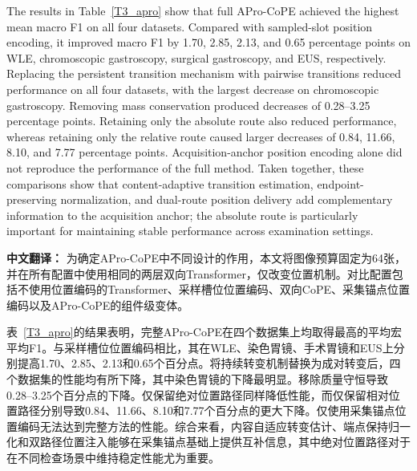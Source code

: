 \documentclass[Afour,sagev,times]{sagej}
\begin{document}
The results in Table~\ref{T3_apro} show that full APro-CoPE achieved the highest mean macro F1 on all four datasets. Compared with sampled-slot position encoding, it improved macro F1 by 1.70, 2.85, 2.13, and 0.65 percentage points on WLE, chromoscopic gastroscopy, surgical gastroscopy, and EUS, respectively. Replacing the persistent transition mechanism with pairwise transitions reduced performance on all four datasets, with the largest decrease on chromoscopic gastroscopy. Removing mass conservation produced decreases of 0.28--3.25 percentage points. Retaining only the absolute route also reduced performance, whereas retaining only the relative route caused larger decreases of 0.84, 11.66, 8.10, and 7.77 percentage points. Acquisition-anchor position encoding alone did not reproduce the performance of the full method. Taken together, these comparisons show that content-adaptive transition estimation, endpoint-preserving normalization, and dual-route position delivery add complementary information to the acquisition anchor; the absolute route is particularly important for maintaining stable performance across examination settings.

\textbf{中文翻译：} 为确定APro-CoPE中不同设计的作用，本文将图像预算固定为64张，并在所有配置中使用相同的两层双向Transformer，仅改变位置机制。对比配置包括不使用位置编码的Transformer、采样槽位位置编码、双向CoPE、采集锚点位置编码以及APro-CoPE的组件级变体。

表~\ref{T3_apro}的结果表明，完整APro-CoPE在四个数据集上均取得最高的平均宏平均F1。与采样槽位位置编码相比，其在WLE、染色胃镜、手术胃镜和EUS上分别提高1.70、2.85、2.13和0.65个百分点。将持续转变机制替换为成对转变后，四个数据集的性能均有所下降，其中染色胃镜的下降最明显。移除质量守恒导致0.28--3.25个百分点的下降。仅保留绝对位置路径同样降低性能，而仅保留相对位置路径分别导致0.84、11.66、8.10和7.77个百分点的更大下降。仅使用采集锚点位置编码无法达到完整方法的性能。综合来看，内容自适应转变估计、端点保持归一化和双路径位置注入能够在采集锚点基础上提供互补信息，其中绝对位置路径对于在不同检查场景中维持稳定性能尤为重要。
\end{document}
